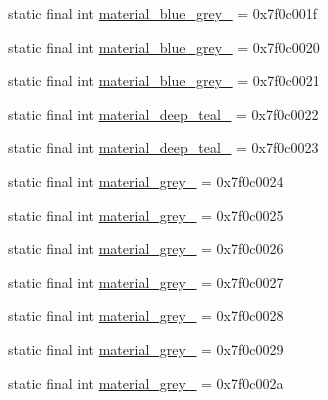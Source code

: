 \begin{CompactItemize}
\item 
static final int \hyperlink{classandroid_1_1support_1_1graphics_1_1drawable_1_1animated_1_1_r_1_1color_ccf43f4af82407978ff2d4f04c1a8c72}{material\_\-blue\_\-grey\_} = 0x7f0c001f
\item 
static final int \hyperlink{classandroid_1_1support_1_1graphics_1_1drawable_1_1animated_1_1_r_1_1color_a72a2d273a87eae2c995d13c859997a4}{material\_\-blue\_\-grey\_} = 0x7f0c0020
\item 
static final int \hyperlink{classandroid_1_1support_1_1graphics_1_1drawable_1_1animated_1_1_r_1_1color_c938ad1f5c380def187203063762f8cc}{material\_\-blue\_\-grey\_} = 0x7f0c0021
\item 
static final int \hyperlink{classandroid_1_1support_1_1graphics_1_1drawable_1_1animated_1_1_r_1_1color_078c8e5a9b66c32464898c964d039920}{material\_\-deep\_\-teal\_} = 0x7f0c0022
\item 
static final int \hyperlink{classandroid_1_1support_1_1graphics_1_1drawable_1_1animated_1_1_r_1_1color_06abbf06a914ce6180522b3cb7f56544}{material\_\-deep\_\-teal\_} = 0x7f0c0023
\item 
static final int \hyperlink{classandroid_1_1support_1_1graphics_1_1drawable_1_1animated_1_1_r_1_1color_9959d772f35d8cb8faf18bda118fb028}{material\_\-grey\_} = 0x7f0c0024
\item 
static final int \hyperlink{classandroid_1_1support_1_1graphics_1_1drawable_1_1animated_1_1_r_1_1color_e9b59a919d2e337cbe292bb933a8830a}{material\_\-grey\_} = 0x7f0c0025
\item 
static final int \hyperlink{classandroid_1_1support_1_1graphics_1_1drawable_1_1animated_1_1_r_1_1color_4cec438cc408f36149cddbbf81ba2600}{material\_\-grey\_} = 0x7f0c0026
\item 
static final int \hyperlink{classandroid_1_1support_1_1graphics_1_1drawable_1_1animated_1_1_r_1_1color_f20210023fa6e3de8a18c0d36ba38e3c}{material\_\-grey\_} = 0x7f0c0027
\item 
static final int \hyperlink{classandroid_1_1support_1_1graphics_1_1drawable_1_1animated_1_1_r_1_1color_94799c68199363d46eb9ed4455b3e1cd}{material\_\-grey\_} = 0x7f0c0028
\item 
static final int \hyperlink{classandroid_1_1support_1_1graphics_1_1drawable_1_1animated_1_1_r_1_1color_9a599400deb109d7d90f1145ae034894}{material\_\-grey\_} = 0x7f0c0029
\item 
static final int \hyperlink{classandroid_1_1support_1_1graphics_1_1drawable_1_1animated_1_1_r_1_1color_b390fe9a24f01f7cb78517fb177ceea2}{material\_\-grey\_} = 0x7f0c002a

\end{CompactItemize}
